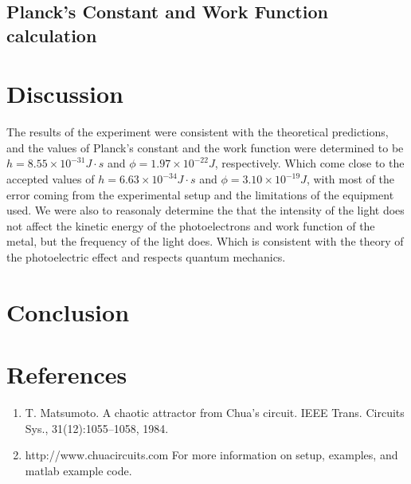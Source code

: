 \documentclass[12pt]{article}
\begin{document}
        \subsection{Planck's Constant and Work Function calculation}

\section{Discussion}
        The results of the experiment were consistent with the theoretical predictions, and the values of Planck's constant and the 
        work function were determined to be \( h = 8.55 \times 10^{-31} J \cdot s \) and \( \phi = 1.97 \times 10^{-22} J \), respectively. 
        Which come close to the accepted values of \( h = 6.63 \times 10^{-34} J \cdot s \) and \( \phi = 3.10 \times 10^{-19} J \), with most of the error coming from the experimental setup and the
        limitations of the equipment used. We were also to reasonaly determine the that the intensity of the light
        does not affect the kinetic energy of the photoelectrons and work function of the metal, but the frequency of the light does. Which is 
        consistent with the theory of the photoelectric effect and respects quantum mechanics.


        


\section{Conclusion}


\section{References}
    \begin{enumerate}
        \sloppy
        \item  T. Matsumoto. A chaotic attractor from Chua’s circuit. IEEE Trans. Circuits Sys., 31(12):1055–1058, 1984.
        \item  http://www.chuacircuits.com For more information on setup, examples, and matlab example code.

    \end{enumerate}
\end{document}
